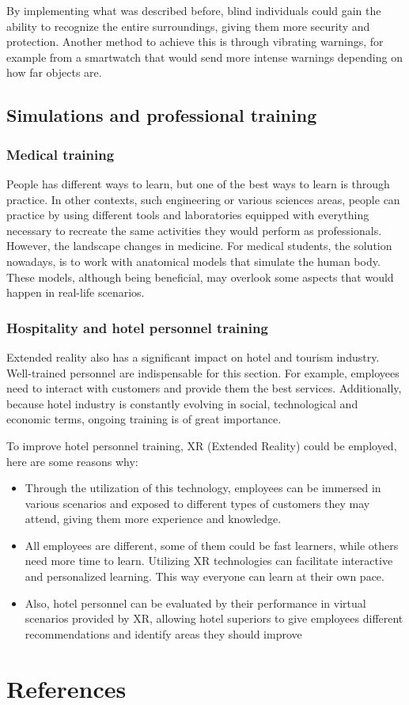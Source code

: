 \documentclass[twoside]{article}
\begin{document}
By implementing what was described before, blind individuals could gain the ability to recognize the entire surroundings, giving them more security and protection. Another method to achieve this is through vibrating warnings, for example from a smartwatch that would send more intense warnings depending on how far objects are.


\subsection{Simulations and professional training}
\subsubsection{Medical training}
People has different ways to learn, but one of the best ways to learn is through practice. In other contexts, such engineering or various sciences areas, people can practice by using different tools and laboratories equipped with everything necessary to recreate the same activities they would perform as professionals. However, the landscape changes in medicine. For medical students, the solution nowadays, is to work with anatomical models that simulate the human body. These models, although being beneficial, may overlook some aspects that would happen in real-life scenarios.
\subsubsection{Hospitality and hotel personnel training}
Extended reality also has a significant impact on hotel and tourism industry. Well-trained personnel are indispensable for this section. For example, employees need to interact with customers and provide them the best services. Additionally, because hotel industry is constantly evolving in social, technological and economic terms, ongoing training is of great importance.

To improve hotel personnel training, XR (Extended Reality) could be employed, here are some reasons why:
\begin{itemize}
    \item Through the utilization of this technology, employees can be immersed in various scenarios and exposed to different types of customers they may attend, giving them more experience and knowledge.
    \item All employees are different, some of them could be fast learners, while others need more time to learn. Utilizing XR technologies can facilitate interactive and personalized learning. This way everyone can learn at their own pace.  
    \item Also, hotel personnel can be evaluated by their performance in virtual scenarios provided by XR, allowing hotel superiors to give employees different recommendations and identify areas they should improve 
\end{itemize}

\newpage
\section{References}
\end{document}
